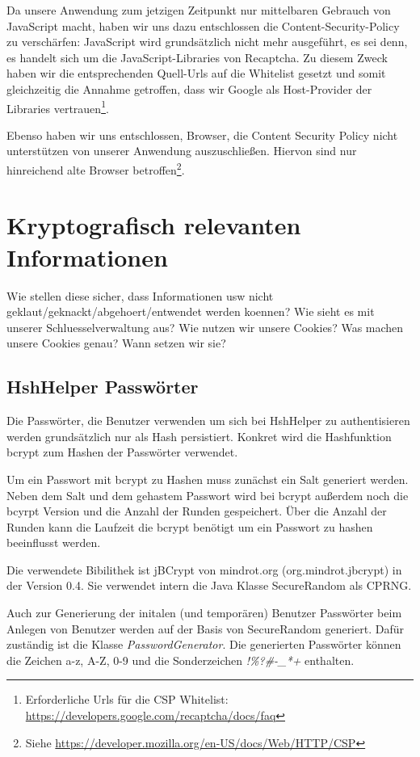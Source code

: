 \documentclass[12pt,DIV14,BCOR10mm,a4paper,twoside,parskip=half-,headsepline,headinclude,english,ngerman,bibliography=totocnumbered]{scrreprt}
\begin{document}
Da unsere Anwendung zum jetzigen Zeitpunkt nur mittelbaren Gebrauch von JavaScript macht, haben wir uns dazu entschlossen die Content-Security-Policy zu verschärfen: JavaScript wird grundsätzlich nicht mehr ausgeführt, es sei denn, es handelt sich um die JavaScript-Libraries von Recaptcha. Zu diesem Zweck haben wir die entsprechenden Quell-Urls auf die Whitelist gesetzt und somit gleichzeitig die Annahme getroffen, dass wir Google als Host-Provider der Libraries vertrauen\footnote{Erforderliche Urls für die CSP Whitelist: \url{https://developers.google.com/recaptcha/docs/faq}}.

Ebenso haben wir uns entschlossen, Browser, die Content Security Policy nicht unterstützen von unserer Anwendung auszuschließen. Hiervon sind nur hinreichend alte Browser betroffen\footnote{Siehe  \url{https://developer.mozilla.org/en-US/docs/Web/HTTP/CSP}}.

\section{Kryptografisch relevanten Informationen}

Wie stellen diese sicher, dass Informationen usw nicht geklaut/geknackt/abgehoert/entwendet werden koennen?
Wie sieht es mit unserer Schluesselverwaltung aus?
Wie nutzen wir unsere Cookies? Was machen unsere Cookies genau?
Wann setzen wir sie?


\subsection{HshHelper Passwörter}
Die Passwörter, die Benutzer verwenden um sich bei HshHelper zu authentisieren werden grundsätzlich nur als Hash persistiert. Konkret wird die Hashfunktion bcrypt zum Hashen der Passwörter verwendet.

Um ein Passwort mit bcrypt zu Hashen muss zunächst ein Salt generiert werden. Neben dem Salt und dem gehastem Passwort wird bei bcrypt außerdem noch die bcyrpt Version und die Anzahl der Runden gespeichert. Über die Anzahl der Runden kann die Laufzeit die bcrypt benötigt um ein Passwort zu hashen beeinflusst werden.

Die verwendete Bibilithek ist jBCrypt von mindrot.org (org.mindrot.jbcrypt) in der Version 0.4. Sie verwendet intern die Java Klasse SecureRandom als CPRNG.

Auch zur Generierung der initalen (und temporären) Benutzer Passwörter beim Anlegen von Benutzer werden auf der Basis von SecureRandom generiert. Dafür zuständig ist die Klasse \textit{PasswordGenerator}. Die generierten Passwörter können die Zeichen a-z, A-Z, 0-9 und die Sonderzeichen \textit{!\%?\#-\_*+} enthalten.
\end{document}

